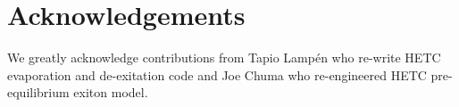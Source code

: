 \section{Acknowledgements}

We greatly acknowledge contributions from Tapio Lamp\'{e}n who re-write HETC evaporation and de-exitation code and
Joe Chuma who re-engineered HETC pre-equilibrium exiton model.



